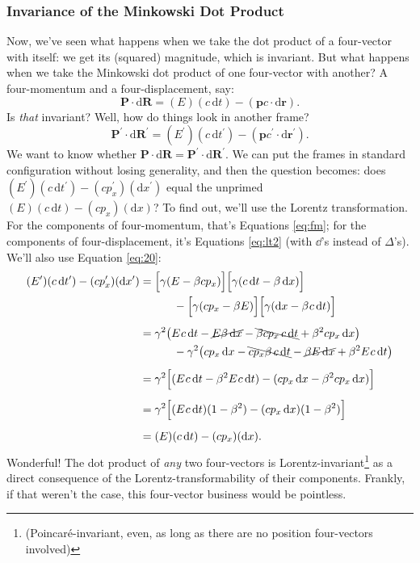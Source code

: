 \documentclass[12pt]{article}
\renewcommand{\vv}[1]{\mathbf{#1}}
\newcommand{\dd}[1]{\mathrm{d}#1}
\begin{document}
\subsubsection{Invariance of the Minkowski Dot Product}

Now, we've seen what happens when we take the dot product of a four-vector with itself: we get its (squared) magnitude, which is invariant. But what happens when we take the Minkowski dot product of one four-vector with another? A four-momentum and a four-displacement, say:
\begin{equation*}
\vv P \cdot \dd \vv R = (E)(c \, \dd t) - (\vv p c \cdot \dd \vv r) .
\end{equation*}
Is \emph{that} invariant? Well, how do things look in another frame?
\begin{equation*}
\vv P^\prime \cdot \dd \vv R^\prime = (E^\prime)(c \, \dd t^\prime) - (\vv p c ^\prime \cdot \dd \vv r ^\prime) .
\end{equation*}
We want to know whether $\vv P \cdot \dd \vv R = \vv P^\prime \cdot \dd \vv R^\prime$. We can put the frames in standard configuration without losing generality, and then the question becomes: does $(E^\prime)(c \, \dd t^\prime) - (cp_x^\prime)(\dd x^\prime)$ equal the unprimed $(E)(c \, \dd t) - (cp_x)(\dd x)$? To find out, we'll use the Lorentz transformation. For the components of four-momentum, that's Equations \ref{eq:fm}; for the components of four-displacement, it's Equations \ref{eq:lt2} (with $\dd$'s instead of $\Delta$'s). We'll also use Equation \ref{eq:20}:
\begin{equation*}
\begin{split}
(E^\prime)(c \, \dd t^\prime) - (cp_x^\prime)(\dd x^\prime)&=\Bigl[ \gamma(E-\beta cp_x) \Bigr] \Bigl[ \gamma(c \, \dd t - \beta \, \dd x) \Bigr]\\
&\quad \quad \quad - \Bigl[ \gamma(cp_x - \beta E) \Bigr] \Bigl[ \gamma(\dd x - \beta \mkern1mu c \, \dd t) \Bigr]\\[5pt]
&=\gamma^2 \bigl( E \mkern1mu c \, \dd t - \cancel{E \beta \, \dd x} - \bcancel{\beta c p_x \, c \, \dd t} + \beta^2 c p_x \, \dd x \bigr) \\
&\quad \quad \quad - \gamma^2 \bigl( cp_x \, \dd x - \bcancel{c p_x \beta \, c \, \dd t} - \cancel{\beta E \, \dd x} + \beta^2 E \mkern1mu c \, \dd t \bigr) \\[5pt]
&=\gamma^2 \Bigl[ (E \mkern1mu c \, \dd t - \beta^2 E \mkern1mu c \, \dd t) - (cp_x \, \dd x - \beta^2 cp_x \, \dd x) \Bigr]\\[5pt]
&=\gamma^2 \Bigl[ (E \mkern1mu c \, \dd t)(1-\beta^2) - (cp_x \, \dd x)(1-\beta^2) \Bigr]\\[5pt]
&=(E)(c \, \dd t) - (cp_x) (\dd x).
\end{split}
\end{equation*}
Wonderful! The dot product of \emph{any} two four-vectors is Lorentz-invariant\footnote{(Poincar\'e-invariant, even, as long as there are no position four-vectors involved)} as a direct consequence of the Lorentz-transformability of their components. Frankly, if that weren't the case, this four-vector business would be pointless.
\end{document}
